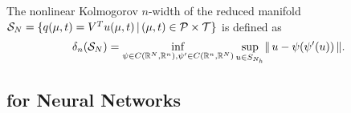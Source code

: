 \begin{definition} \label{def: nonlinear kolmogorov}
    The nonlinear Kolmogorov $n$-width of the reduced manifold $\mathcal{S}_N = \{ q(\mu, t) = V^T u(\mu, t) \, \vert \, (\mu, t) \in \mathcal{P} \times \mathcal{T} \}$ is defined as 
    \begin{equation*}
        \delta_n(\mathcal{S}_N) = \inf\limits_{\psi \in C(\mathbb{R}^N, \mathbb{R}^n), \psi' \in C(\mathbb{R}^n, \mathbb{R}^N)} \sup\limits_{u \in S_{N_h}} \lVert \, u - \psi(\psi'(u)) \, \rVert.
    \end{equation*}
\end{definition}

\subsection{for Neural Networks} \label{section: background for nn}

